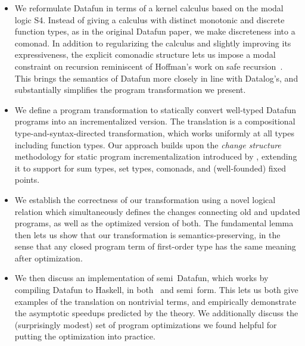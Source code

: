 \begin{itemize}
\item We reformulate Datafun in terms of a kernel calculus based on
  the modal logic S4. Instead of giving a calculus with distinct
  monotonic and discrete function types, as in the original Datafun
  paper, we make discreteness into a comonad. In addition to
  regularizing the calculus and slightly improving its expressiveness,
  the explicit comonadic structure lets us impose a modal constraint
  on recursion reminiscent of Hoffman's work on safe
  recursion~\cite{hofmann-safe-recursion}. This brings the semantics
  of Datafun more closely in line with Datalog's, and substantially
  simplifies the program transformation we present.
  
\item We define a program transformation to statically convert
  well-typed Datafun programs into an incrementalized version. The
  translation is a compositional type-and-syntax-directed
  transformation, which works uniformly at all types including
  function types. Our approach builds upon the \emph{change structure}
  methodology for static program incrementalization introduced by
  \citet{incremental}, extending it to support for sum types, set
  types, comonads, and (well-founded) fixed points.

\item We establish the correctness of our transformation using a novel logical
  relation which simultaneously defines the changes connecting old and updated
  programs, as well as the optimized version of both. The fundamental lemma then
  lets us show that our transformation is semantics-preserving, in the sense
  that any closed program term of first-order type has the same meaning after
  optimization.
  
\item We then discuss an implementation of semi\naive\ Datafun, which
  works by compiling Datafun to Haskell, in both \naive\ and
  semi\naive\ form. This lets us both give examples of the translation
  on nontrivial terms, and empirically demonstrate the asymptotic
  speedups predicted by the theory. We additionally discuss the
  (surprisingly modest) set of program optimizations we found
  helpful for putting the 
  optimization into  practice. 
\end{itemize}
